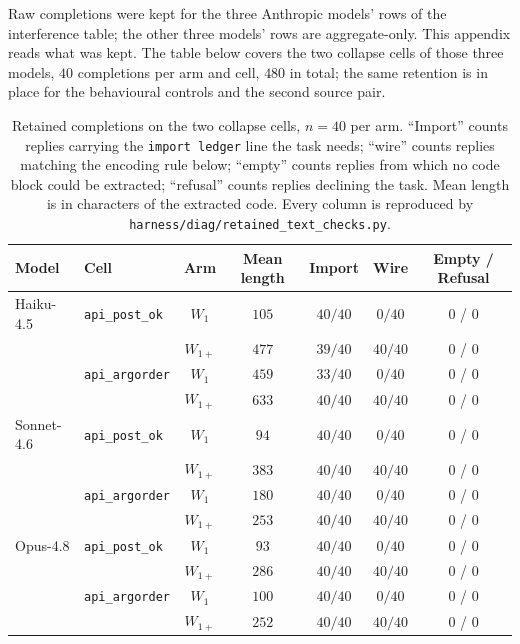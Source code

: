 \documentclass[11pt]{article}
\theoremstyle{plain}
\theoremstyle{definition}
\theoremstyle{remark}
\begin{document}
Raw completions were kept for the three Anthropic models' rows of the interference table; the
other three models' rows are aggregate-only. This appendix reads what was kept. The table below
covers the two collapse cells of those three models, $40$ completions per arm and cell, $480$ in
total; the same retention is in place for the behavioural controls and the second source pair.

\begin{table}[t]
\centering
\footnotesize
\caption{Retained completions on the two collapse cells, $n=40$ per arm. ``Import'' counts
replies carrying the \texttt{import ledger} line the task needs; ``wire'' counts replies matching
the encoding rule below; ``empty'' counts replies from which no code block could be extracted;
``refusal'' counts replies declining the task. Mean length is in characters of the extracted
code. Every column is reproduced by \texttt{harness/diag/retained\_text\_checks.py}.}
\label{tab:retained}
\begin{tabular}{@{}llccccc@{}}
\toprule
Model & Cell & Arm & Mean length & Import & Wire & Empty / Refusal \\
\midrule
Haiku-4.5  & \texttt{api\_post\_ok}  & $W_1$     & $105$ & $40/40$ & $0/40$  & $0$ / $0$ \\
           &                         & $W_{1+}$  & $477$ & $39/40$ & $40/40$ & $0$ / $0$ \\
           & \texttt{api\_argorder}  & $W_1$     & $459$ & $33/40$ & $0/40$  & $0$ / $0$ \\
           &                         & $W_{1+}$  & $633$ & $40/40$ & $40/40$ & $0$ / $0$ \\
Sonnet-4.6 & \texttt{api\_post\_ok}  & $W_1$     & $94$  & $40/40$ & $0/40$  & $0$ / $0$ \\
           &                         & $W_{1+}$  & $383$ & $40/40$ & $40/40$ & $0$ / $0$ \\
           & \texttt{api\_argorder}  & $W_1$     & $180$ & $40/40$ & $0/40$  & $0$ / $0$ \\
           &                         & $W_{1+}$  & $253$ & $40/40$ & $40/40$ & $0$ / $0$ \\
Opus-4.8   & \texttt{api\_post\_ok}  & $W_1$     & $93$  & $40/40$ & $0/40$  & $0$ / $0$ \\
           &                         & $W_{1+}$  & $286$ & $40/40$ & $40/40$ & $0$ / $0$ \\
           & \texttt{api\_argorder}  & $W_1$     & $100$ & $40/40$ & $0/40$  & $0$ / $0$ \\
           &                         & $W_{1+}$  & $252$ & $40/40$ & $40/40$ & $0$ / $0$ \\
\bottomrule
\end{tabular}
\end{table}
\end{document}
